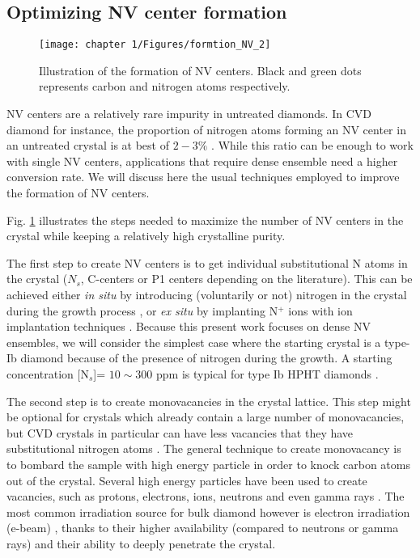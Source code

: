 \documentclass[a4paper, 11pt]{report}
\begin{document}
\subsection{Optimizing NV center formation}
\begin{figure}[h!]
\centering
\texttt{[image: chapter 1/Figures/formtion\_NV\_2]}
\caption{Illustration of the formation of NV centers. Black and green dots represents carbon and nitrogen atoms respectively.}
\label{formation NV}
\end{figure}

NV centers are a relatively rare impurity in untreated diamonds. In CVD diamond for instance, the proportion of nitrogen atoms forming an NV center in an untreated crystal is at best of $2-3 \%$ \citep{hartland2014study}. While this ratio can be enough to work with single NV centers, applications that require dense ensemble need a higher conversion rate. We will discuss here the usual techniques employed to improve the formation of NV centers.

Fig. \ref{formation NV} illustrates the steps needed to maximize the number of NV centers in the crystal while keeping a relatively high crystalline purity.

The first step to create NV centers is to get individual substitutional N atoms in the crystal ($N_s$, C-centers or P1 centers depending on the literature). This can be achieved either \textit{in situ} by introducing (voluntarily or not) nitrogen in the crystal during the growth process \citep{tallaire2006characterisation, lobaev2017influence}, or \textit{ex situ} by implanting N$^+$ ions with ion implantation techniques \citep{meijer2005generation, smith2019colour}. Because this present work focuses on dense NV ensembles, we will consider the simplest case where the starting crystal is a type-Ib diamond because of the presence of nitrogen during the growth. A starting concentration [N$_s$]= $10 \sim 300$ ppm is typical for type Ib HPHT diamonds \citep{achard2020chemical}.

The second step is to create monovacancies in the crystal lattice. This step might be optional for crystals which already contain a large number of monovacancies, but CVD crystals in particular can have less vacancies that they have substitutional nitrogen atoms \citep{mainwood1999point}. The general technique to create monovacancy is to bombard the sample with high energy particle in order to knock carbon atoms out of the crystal. Several high energy particles have been used to create vacancies, such as protons, electrons, ions, neutrons and even gamma rays \citep{davies1976optical, ashbaugh1988gemstone, kleinsasser2016high}. The most common irradiation source for bulk diamond however is electron irradiation (e-beam) \citep{acosta2009diamonds}, thanks to their higher availability (compared to neutrons or gamma rays) and their ability to deeply penetrate the crystal.
\end{document}
